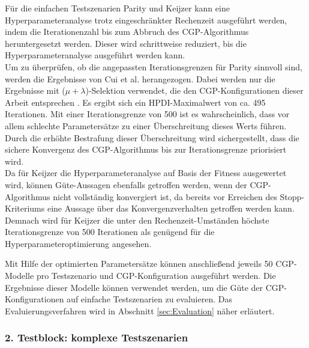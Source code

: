Für die einfachen Testszenarien Parity und Keijzer kann eine Hyperparameteranalyse trotz eingeschränkter Rechenzeit ausgeführt werden, indem die Iterationenzahl bis zum Abbruch des CGP-Algorithmus heruntergesetzt werden.
Dieser wird schrittweise reduziert, bis die Hyperparameteranalyse ausgeführt werden kann.\\
Um zu überprüfen, ob die angepassten Iterationsgrenzen für Parity sinnvoll sind, werden die Ergebnisse von Cui et al. herangezogen. 
Dabei werden nur die Ergebnisse mit ($\mu + \lambda$)-Selektion verwendet, die den CGP-Konfigurationen dieser Arbeit entsprechen \cite{cui_results}.
Es ergibt sich ein HPDI-Maximalwert von ca. 495 Iterationen. 
Mit einer Iterationsgrenze von 500 ist es wahrscheinlich, dass vor allem schlechte Parametersätze zu einer Überschreitung dieses Werts führen.
Durch die erhöhte Bestrafung dieser Überschreitung wird sichergestellt, dass die sichere Konvergenz des CGP-Algorithmus bis zur Iterationsgrenze priorisiert wird.\\
Da für Keijzer die Hyperparameteranalyse auf Basis der Fitness ausgewertet wird, können Güte-Aussagen ebenfalls getroffen werden, wenn der CGP-Algorithmus nicht vollständig konvergiert ist, da bereits vor Erreichen des Stopp-Kriteriums eine Aussage über das Konvergenzverhalten getroffen werden kann.
Demnach wird für Keijzer die unter den Rechenzeit-Umständen höchste Iterationsgrenze von 500 Iterationen als genügend für die Hyperparameteroptimierung angesehen.

Mit Hilfe der optimierten Parametersätze können anschließend jeweils 50 CGP-Modelle pro Testszenario und CGP-Konfiguration ausgeführt werden.
Die Ergebnisse dieser Modelle können verwendet werden, um die Güte der CGP-Konfigurationen auf einfache Testszenarien zu evaluieren.
Das Evaluierungsverfahren wird in Abschnitt \ref{sec:Evaluation} näher erläutert.

\subsubsection{2. Testblock: komplexe Testszenarien}
\label{subsub:zweiterTestblock}

